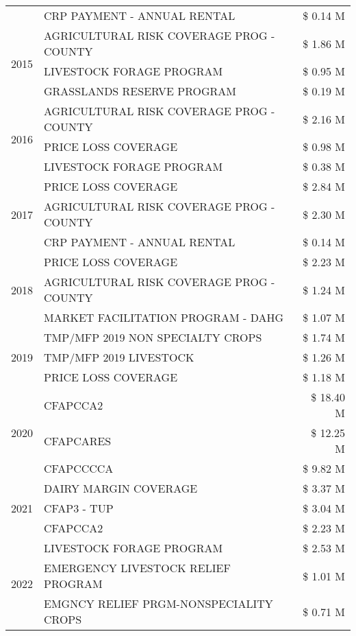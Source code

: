 \begin{tabular}{llr}
 & CRP PAYMENT - ANNUAL RENTAL & \$ 0.14 M \\
\cline{1-3}
\multirow[t]{3}{*}{2015} & AGRICULTURAL RISK COVERAGE PROG - COUNTY & \$ 1.86 M \\
 & LIVESTOCK FORAGE PROGRAM & \$ 0.95 M \\
 & GRASSLANDS RESERVE PROGRAM & \$ 0.19 M \\
\cline{1-3}
\multirow[t]{3}{*}{2016} & AGRICULTURAL RISK COVERAGE PROG - COUNTY & \$ 2.16 M \\
 & PRICE LOSS COVERAGE & \$ 0.98 M \\
 & LIVESTOCK FORAGE PROGRAM & \$ 0.38 M \\
\cline{1-3}
\multirow[t]{3}{*}{2017} & PRICE LOSS COVERAGE & \$ 2.84 M \\
 & AGRICULTURAL RISK COVERAGE PROG - COUNTY & \$ 2.30 M \\
 & CRP PAYMENT - ANNUAL RENTAL & \$ 0.14 M \\
\cline{1-3}
\multirow[t]{3}{*}{2018} & PRICE LOSS COVERAGE & \$ 2.23 M \\
 & AGRICULTURAL RISK COVERAGE PROG - COUNTY & \$ 1.24 M \\
 & MARKET FACILITATION PROGRAM - DAHG & \$ 1.07 M \\
\cline{1-3}
\multirow[t]{3}{*}{2019} & TMP/MFP 2019 NON SPECIALTY CROPS & \$ 1.74 M \\
 & TMP/MFP 2019 LIVESTOCK & \$ 1.26 M \\
 & PRICE LOSS COVERAGE & \$ 1.18 M \\
\cline{1-3}
\multirow[t]{3}{*}{2020} & CFAPCCA2 & \$ 18.40 M \\
 & CFAPCARES & \$ 12.25 M \\
 & CFAPCCCCA & \$ 9.82 M \\
\cline{1-3}
\multirow[t]{3}{*}{2021} & DAIRY MARGIN COVERAGE & \$ 3.37 M \\
 & CFAP3 - TUP & \$ 3.04 M \\
 & CFAPCCA2 & \$ 2.23 M \\
\cline{1-3}
\multirow[t]{3}{*}{2022} & LIVESTOCK FORAGE PROGRAM & \$ 2.53 M \\
 & EMERGENCY LIVESTOCK RELIEF PROGRAM & \$ 1.01 M \\
 & EMGNCY RELIEF PRGM-NONSPECIALITY CROPS & \$ 0.71 M \\
\cline{1-3}
\bottomrule
\end{tabular}
